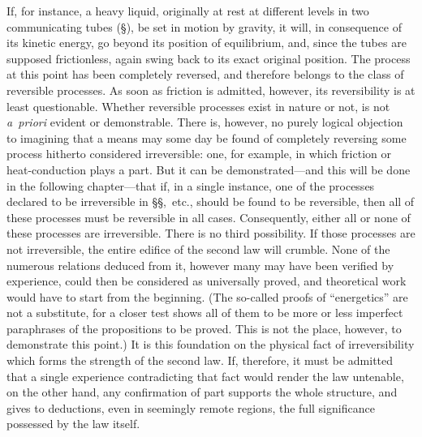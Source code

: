 \documentclass[12pt]{book}[2005/09/16]
\newcommand{\SecRef}[2][§\;]{\hyperref[section:#2.]{{\upshape #1#2}}}
\newcommand{\SSecRef}[1]{\SecRef[§§\;]{#1}}
\newcommand{\PageSep}[1]{\ignorespaces}
\begin{document}
If, for instance, a heavy liquid, originally at rest at
different levels in two communicating tubes (\SecRef{107}), be set
in motion by gravity, it will, in consequence of its kinetic
energy, go beyond its position of equilibrium, and, since
the tubes are supposed frictionless, again swing back to its
exact original position. The process at this point has been
completely reversed, and therefore belongs to the class of
reversible processes. As soon as friction is admitted, however,
its reversibility is at least questionable. Whether
reversible processes exist in nature or not, is not \textit{a~priori}
evident or demonstrable. There is, however, no purely
\PageSep{84}
logical objection to imagining that a means may some day
be found of completely reversing some process hitherto considered
irreversible: one, for example, in which friction or
heat-conduction plays a part. But it can be demonstrated---and
this will be done in the following chapter---that if, in
a single instance, one of the processes declared to be irreversible
in \SSecRef{109},~etc., should be found to be reversible,
then all of these processes must be reversible in all cases.
Consequently, either all or none of these processes are
irreversible. There is no third possibility. If those processes
are not irreversible, the entire edifice of the second
law will crumble. None of the numerous relations deduced
from it, however many may have been verified by experience,
could then be considered as universally proved, and theoretical
work would have to start from the beginning. (The
so-called proofs of ``energetics'' are not a substitute, for a
%
closer test shows all of them to be more or less imperfect
paraphrases of the propositions to be proved. This is not
the place, however, to demonstrate this point.) It is this
foundation on the physical fact of irreversibility which forms
the strength of the second law. If, therefore, it must be
admitted that a single experience contradicting that fact
would render the law untenable, on the other hand, any
confirmation of part supports the whole structure, and gives
to deductions, even in seemingly remote regions, the full
significance possessed by the law itself.
\end{document}
